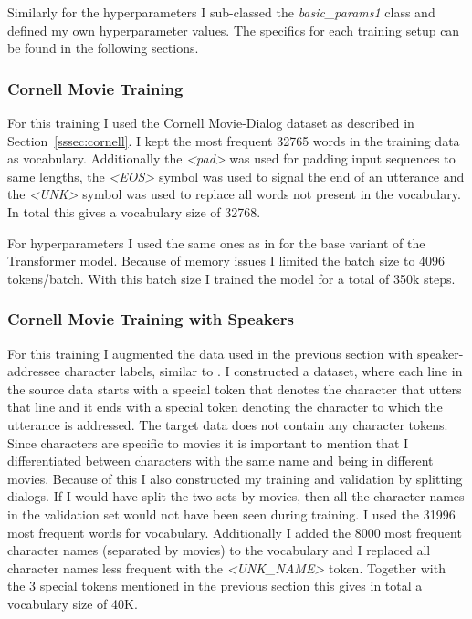 \documentclass[12pt]{article}
\begin{document}
Similarly for the hyperparameters I sub-classed the \textit{basic}\textit{\_}\textit{params1} class and defined my own hyperparameter values. The specifics for each training setup can be found in the following sections.

\subsubsection{Cornell Movie Training} \label{sssec:cornell_training}
For this training I used the Cornell Movie-Dialog dataset as described in Section~\ref{sssec:cornell}. I kept the most frequent 32765 words in the training data as vocabulary. Additionally the \textit{\textless pad\textgreater} was used for padding input sequences to same lengths, the \textit{\textless EOS\textgreater} symbol was used to signal the end of an utterance and the \textit{\textless UNK\textgreater} symbol was used to replace all words not present in the vocabulary. In total this gives a vocabulary size of 32768.

For hyperparameters I used the same ones as in \cite{Vaswani:2017} for the base variant of the Transformer model. Because of memory issues I limited the batch size to 4096 tokens/batch. With this batch size I trained the model for a total of 350k steps.
\subsubsection{Cornell Movie Training with Speakers} \label{sssec:cornell_speakers}
For this training I augmented the data used in the previous section with speaker-addressee character labels, similar to \cite{Li:2016}. I constructed a dataset, where each line in the source data starts with a special token that denotes the character that utters that line and it ends with a special token denoting the character to which the utterance is addressed. The target data does not contain any character tokens. Since characters are specific to movies it is important to mention that I differentiated between characters with the same name and being in different movies. Because of this I also constructed my training and validation by splitting dialogs. If I would have split the two sets by movies, then all the character names in the validation set would not have been seen during training. I used the 31996 most frequent words for vocabulary. Additionally I added the 8000 most frequent character names (separated by movies) to the vocabulary and I replaced all character names less frequent with the \textit{\textless UNK\_NAME\textgreater} token. Together with the 3 special tokens mentioned in the previous section this gives in total a vocabulary size of 40K.
\end{document}
